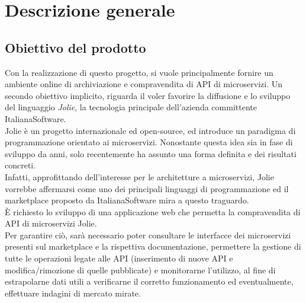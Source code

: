 \newpage
\section{Descrizione generale}
\subsection{Obiettivo del prodotto}
Con la realizzazione di questo progetto, si vuole principalmente fornire un ambiente online di archiviazione e compravendita di API di microservizi. Un secondo obiettivo implicito, riguarda il voler favorire la diffusione e lo sviluppo del linguaggio \textit{Jolie}, la tecnologia principale dell'azienda committente ItalianaSoftware.\\
Jolie è un progetto internazionale ed open-source, ed introduce un paradigma di programmazione orientato ai microservizi. Nonostante questa idea sia in fase di sviluppo da anni, solo recentemente ha assunto una forma definita e dei risultati concreti.\\
Infatti, approfittando dell'interesse per le architetture a microservizi, Jolie vorrebbe affermarsi come uno dei principali linguaggi di programmazione ed il marketplace proposto da ItalianaSoftware mira a questo traguardo.\\ \MakeUppercase{è} richiesto lo sviluppo di una applicazione web che permetta la compravendita di API di microservizi Jolie.\\
Per garantire ciò, sarà necessario poter consultare le interfacce dei microservizi presenti sul marketplace e la rispettiva documentazione, permettere la gestione di tutte le operazioni legate alle API (inserimento di nuove API e modifica/rimozione di quelle pubblicate) e monitorarne l'utilizzo, al fine di estrapolarne dati utili a verificarne il corretto funzionamento ed eventualmente, effettuare indagini di mercato mirate.

